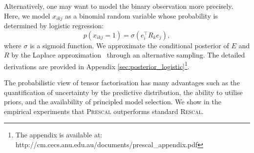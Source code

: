 Alternatively, one may want to model the binary observation more precisely.
Here, we model $x_{ikj}$ as a binomial random variable whose
probability is determined by logistic regression:
\[
p(x_{ikj}=1) = \sigma(e_i^{\top} R_k e_j),
\]
where $\sigma$ is a sigmoid function.
We approximate the conditional posterior of
$E$ and $R$ by the Laplace approximation~\cite{bishop2006pattern} through an alternative sampling. The detailed derivations are provided in Appendix \ref{sec:posterior_logistic}\footnote{The appendix is available at: http://cm.cecs.anu.edu.au/documents/prescal\_appendix.pdf}.

The probabilistic view of tensor factorisation has many advantages such as
the quantification of uncertainty by the predictive distribution,
the ability to utilise priors, and
the availability of principled model selection.
We show in the empirical experiments that \textsc{Prescal} outperforms standard \textsc{Rescal}.
